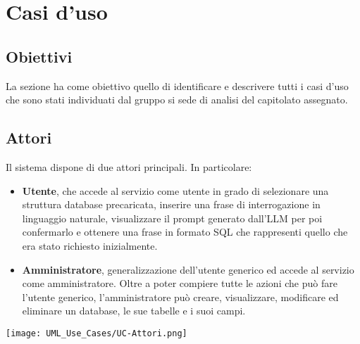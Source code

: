 \section{Casi d'uso}



\subsection{Obiettivi}
La sezione ha come obiettivo quello di identificare e descrivere tutti i casi d'uso che sono stati individuati dal gruppo si sede di analisi del capitolato assegnato.

\subsection{Attori}
Il sistema dispone di due attori principali. In particolare:
\begin{itemize}
	\item \textbf{Utente}, che accede al servizio come utente in grado di selezionare una struttura database precaricata, inserire una frase di interrogazione in linguaggio naturale, visualizzare il prompt generato dall'LLM per poi confermarlo e ottenere una frase in formato SQL che rappresenti quello che era stato richiesto inizialmente.
	\item \textbf{Amministratore}, generalizzazione dell'utente generico ed accede al servizio come amministratore. Oltre a poter compiere tutte le azioni che può fare l'utente generico, l'amministratore può creare, visualizzare, modificare ed eliminare un database, le sue tabelle e i suoi campi.
\end{itemize}
\texttt{[image: UML\_Use\_Cases/UC-Attori.png]}

